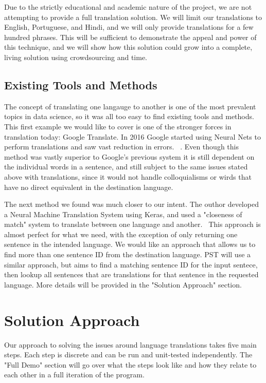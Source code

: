 \documentclass[runningheads]{llncs}
\begin{document}
	Due to the strictly educational and academic nature of the project, we are not attempting to provide a full translation solution. We will limit our translations to English, Portuguese, and Hindi, and we will only provide translations for a few hundred phrases. This will be sufficient to demonstrate the appeal and power of this technique, and we will show how this solution could grow into a complete, living solution using crowdsourcing and time. 
	
	\subsection{Existing Tools and Methods}
	The concept of translating one langauge to another is one of the most prevalent topics in data science, so it was all too easy to find existing tools and methods. This first example we would like to cover is one of the stronger forces in translation today: Google Translate. In 2016 Google started using Neural Nets to perform translations and saw vast reduction in errors. ~\cite{ref_url18}. Even though this method was vastly superior to Google's previous system it is still dependent on the individual words in a sentence, and still subject to the same issues stated above with translations, since it would not handle colloquialisms or wirds that have no direct equivalent in the destination language. 

	The next method we found was much closer to our intent. The outhor developed a Neural Machine Translation System using Keras, and used a "closeness of match" system to translate between one language and another.~\cite{ref_url16} This approach is almost perfect for what we need, with the exception of only returning one sentence in the intended language. We would like an approach that allows us to find more than one sentence ID from the destination language. PST will use a similar approach, but aims to find a matching sentence ID for the input sentece, then lookup all sentences that are translations for that sentence in the requested language. More details will be provided in the "Solution Approach" section.
	
	\section{Solution Approach}
	Our approach to solving the issues around language translations takes five main steps. Each step is discrete and can be run and unit-tested independently. The "Full Demo" section will go over what the steps look like and how they relate to each other in a full iteration of the program. 
\end{document}
